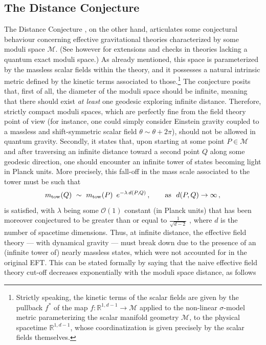 \subsection{The Distance Conjecture}\label{s:SDC}

The Distance Conjecture \cite{Ooguri:2006in}, on the other hand, articulates some conjectural behaviour concerning effective gravitational theories characterized by some moduli space $\mathcal{M}$. (See however \cite{Calderon-Infante:2020dhm} for extensions and checks in theories lacking a quantum exact moduli space.) As already mentioned, this space is parameterized by the massless scalar fields within the theory, and it possesses a natural intrinsic metric defined by the kinetic terms associated to those.\footnote{Strictly speaking, the kinetic terms of the scalar fields are given by the pullback $f^*$ of the map $f: \mathbb{R}^{1, d-1} \to \mathcal{M}$ applied to the non-linear $\sigma$-model metric parameterizing the scalar manifold geometry $\mathcal{M}$, to the physical spacetime $\mathbb{R}^{1, d-1}$, whose coordinatization is given precisely by the scalar fields themselves.} The conjecture posits that, first of all, the diameter of the moduli space should be infinite, meaning that there should exist \emph{at least} one geodesic exploring infinite distance. Therefore, strictly compact moduli spaces, which are perfectly fine from the field theory point of view (for instance, one could simply consider Einstein gravity coupled to a massless and shift-symmetric scalar field $\theta \sim \theta + 2\pi$), should not be allowed in quantum gravity. Secondly, it states that, upon starting at some point $P \in \mathcal{M}$ and after traversing an infinite distance toward a second point $Q$ along some geodesic direction, one should encounter an infinite tower of states becoming light in Planck units. More precisely, this fall-off in the mass scale associated to the tower must be such that 
%
\begin{equation}
m_{\rm tow}(Q)\ \sim \ m_{\rm tow}(P) \ \, e^{-\lambda \,  d(P,Q)}\, , \qquad \text{as}\ \ d(P,Q)\rightarrow \infty\, ,
\label{eq:masslesstower}
\end{equation}
%
is satisfied, with $\lambda$ being some $\mathcal{O}(1)$ constant (in Planck units) that has been moreover conjectured to be greater than or equal to $\frac{1}{\sqrt{d-2}}$ \cite{Etheredge:2022opl}, where $d$ is the number of spacetime dimensions. Thus, at infinite distance, the effective field theory --- with dynamical gravity --- must break down due to the presence of an (infinite tower of) nearly massless states, which were not accounted for in the original EFT. This can be stated formally by saying that the naive effective field theory cut-off decreases exponentially with the moduli space distance, as follows
